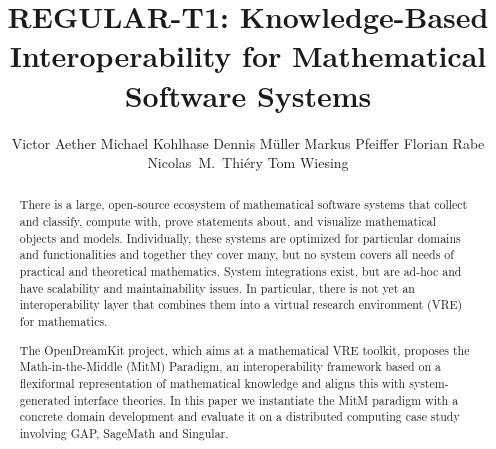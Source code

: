\documentclass{llncs}
\title{REGULAR-T1: Knowledge-Based Interoperability for Mathematical Software Systems}
\author{
Victor Aether\inst{2} 
 Michael Kohlhase\inst{1} 
Dennis M\"uller\inst{1} 
Markus Pfeiffer\inst{2} 
Florian Rabe\inst{2} 
Nicolas~M.~Thiéry\inst{3} 
Tom Wiesing\inst{2}
}
\institute{
   FAU Erlangen-N\"urnberg
   \and University of St~Andrews 
   \and Universit\'e Paris-Sud
}
\begin{document}
\maketitle
\begin{abstract}
  There is a large, open-source ecosystem of mathematical software systems that collect and
  classify, compute with, prove statements about, and visualize mathematical objects and
  models. Individually, these systems are optimized for particular domains and
  functionalities and together they cover many, but no system covers all needs of
  practical and theoretical mathematics. System integrations exist, but are ad-hoc and
  have scalability and maintainability issues. In particular, there is not yet an
  interoperability layer that combines them into a virtual research environment (VRE) for
  mathematics.
  
  The OpenDreamKit project, which aims at a mathematical VRE toolkit, proposes the
  Math-in-the-Middle (MitM) Paradigm, an interoperability framework based on a flexiformal
  representation of mathematical knowledge and aligns this with system-generated interface
  theories. In this paper we instantiate the MitM paradigm with a concrete domain
  development and evaluate it on a distributed computing case study involving GAP,
  SageMath and Singular. 
\end{abstract}






  
  
\printbibliography
\end{document}
